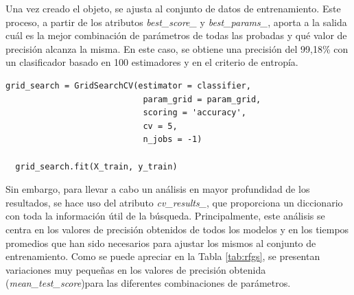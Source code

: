 \vspace{3mm}

Una vez creado el objeto, se ajusta al conjunto de datos de entrenamiento. Este proceso, a partir de los atributos \textit{best\_score\_} y \textit{best\_params\_}, aporta a la salida cuál es la mejor combinación de parámetros de todas las probadas y qué valor de precisión alcanza la misma. En este caso, se obtiene una precisión del 99,18\% con un clasificador basado en 100 estimadores y en el criterio de entropía. 

\vspace{3mm}

\begin{lstlisting}[style=Python, caption={Construcción del objeto \textit{GridSearchCV()}}]
  grid_search = GridSearchCV(estimator = classifier,
                            param_grid = param_grid,
                            scoring = 'accuracy',
                            cv = 5,
                            n_jobs = -1)

  grid_search.fit(X_train, y_train)
\end{lstlisting}

\vspace{3mm}

Sin embargo, para llevar a cabo un análisis en mayor profundidad de los resultados, se hace uso del atributo \textit{cv\_results\_}, que proporciona un diccionario con toda la información útil de la búsqueda. Principalmente, este análisis se centra en los valores de precisión obtenidos de todos los modelos y en los tiempos promedios que han sido necesarios para ajustar los mismos al conjunto de entrenamiento. Como se puede apreciar en la Tabla \ref{tab:rfgs}, se presentan variaciones muy pequeñas en los valores de precisión obtenida (\textit{mean\_test\_score})para las diferentes combinaciones de parámetros.

\vspace{3mm}

